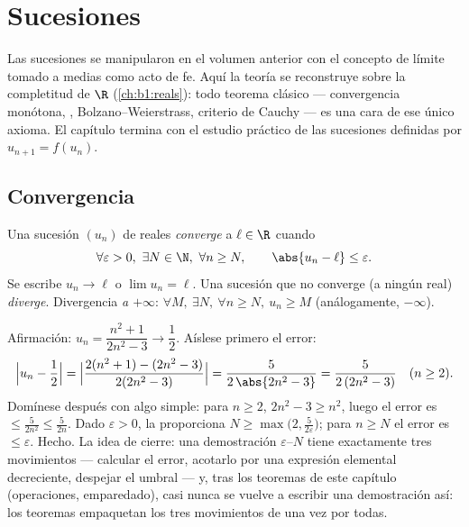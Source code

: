 \chapter{Sucesiones}\label{ch:b1:seq}

Las sucesiones se manipularon en el volumen anterior con el concepto de
límite tomado a medias como acto de fe. Aquí la teoría se reconstruye
sobre la completitud de $\R$ (\cref{ch:b1:reals}): todo teorema clásico
--- convergencia monótona, ,
Bolzano--Weierstrass, criterio de Cauchy --- es una cara de ese único
axioma. El capítulo termina con el estudio práctico de las sucesiones
definidas por $u_{n+1} = f(u_n)$.

\section{Convergencia}

\begin{definition}\label{def:b1:seq:limit}
Una sucesión $(u_n)$ de reales \emph{converge} a $\ell \in \R$
cuando
\[
\forall \varepsilon > 0,\ \exists N \in \N,\ \forall n \geq N,
\qquad \abs{u_n - \ell} \leq \varepsilon .
\]
Se escribe $u_n \to \ell$ o $\lim u_n = \ell$. Una sucesión que no
converge (a ningún real) \emph{diverge}. Divergencia \emph{a
$+\infty$}: $\forall M,\ \exists N,\ \forall n \geq N,\ u_n \geq M$
(análogamente, $-\infty$).
\end{definition}

\begin{example}\label{ex:b1:seq:epsilonN}
Afirmación: $u_n = \dfrac{n^2 + 1}{2n^2 - 3} \to \dfrac12$. Aíslese
primero el error:
\[
\Bigl| u_n - \frac12 \Bigr|
= \Bigl| \frac{2(n^2 + 1) - (2n^2 - 3)}{2(2n^2 - 3)} \Bigr|
= \frac{5}{2\,\abs{2n^2 - 3}}
= \frac{5}{2\,(2n^2 - 3)} \quad (n \geq 2).
\]
Domínese después con algo simple: para $n \geq 2$, $2n^2 - 3 \geq n^2$,
luego el error es $\leq \frac{5}{2n^2} \leq \frac 5{2n}$. Dado
$\varepsilon > 0$, la  proporciona
$N \geq \max\bigl(2, \frac{5}{2\varepsilon}\bigr)$; para $n \geq N$ el
error es $\leq \varepsilon$. Hecho. La idea de cierre: una
demostración $\varepsilon$--$N$ tiene exactamente tres movimientos ---
calcular el error, acotarlo por una expresión elemental decreciente,
despejar el umbral --- y, tras los teoremas de este capítulo
(operaciones, emparedado), casi nunca se vuelve a escribir una
demostración así: los teoremas empaquetan los tres movimientos de una
vez por todas.
\end{example}

